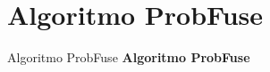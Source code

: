 \section{Algoritmo ProbFuse}
\begin{frame}{Algoritmo ProbFuse}
	\centering
	\textbf{\Huge{Algoritmo ProbFuse}}
\end{frame}


